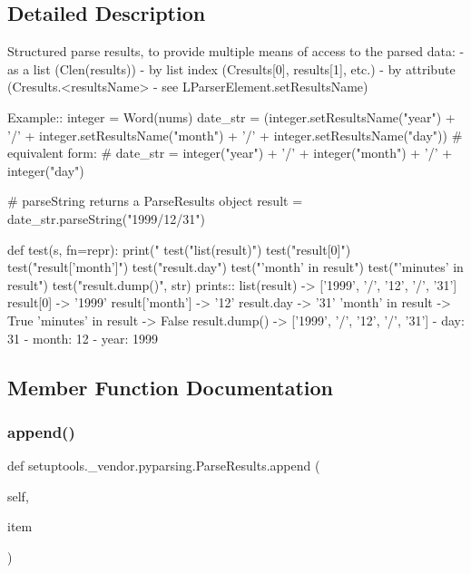 \subsection{Detailed Description}
\begin{DoxyVerb}Structured parse results, to provide multiple means of access to the parsed data:
   - as a list (C{len(results)})
   - by list index (C{results[0], results[1]}, etc.)
   - by attribute (C{results.<resultsName>} - see L{ParserElement.setResultsName})

Example::
    integer = Word(nums)
    date_str = (integer.setResultsName("year") + '/' 
                    + integer.setResultsName("month") + '/' 
                    + integer.setResultsName("day"))
    # equivalent form:
    # date_str = integer("year") + '/' + integer("month") + '/' + integer("day")

    # parseString returns a ParseResults object
    result = date_str.parseString("1999/12/31")

    def test(s, fn=repr):
        print("%
    test("list(result)")
    test("result[0]")
    test("result['month']")
    test("result.day")
    test("'month' in result")
    test("'minutes' in result")
    test("result.dump()", str)
prints::
    list(result) -> ['1999', '/', '12', '/', '31']
    result[0] -> '1999'
    result['month'] -> '12'
    result.day -> '31'
    'month' in result -> True
    'minutes' in result -> False
    result.dump() -> ['1999', '/', '12', '/', '31']
    - day: 31
    - month: 12
    - year: 1999
\end{DoxyVerb}
 

\subsection{Member Function Documentation}
\mbox{\label{classsetuptools_1_1__vendor_1_1pyparsing_1_1_parse_results_a3bf4e13f4fa75a900b57b26e848c35c2}} 
\subsubsection{\texorpdfstring{append()}{append()}}
{\footnotesize\ttfamily def setuptools.\+\_\+vendor.\+pyparsing.\+Parse\+Results.\+append (\begin{DoxyParamCaption}\item[{}]{self,  }\item[{}]{item }\end{DoxyParamCaption})}

